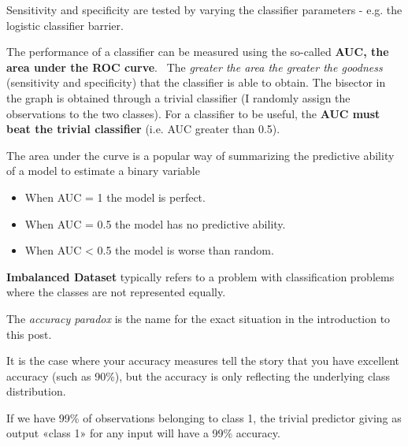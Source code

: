 Sensitivity and specificity are tested by varying the classifier parameters - e.g. the logistic classifier barrier.


The performance of a classifier can be measured using the so-called \textbf{AUC, the area under the ROC curve}. \ The \textit{greater the area the greater the goodness} (sensitivity and specificity) that the classifier is able to obtain. The bisector in the graph is obtained through a trivial classifier (I randomly assign the observations to the two classes). For a classifier to be useful, the \textbf{AUC must beat the trivial classifier} (i.e. AUC greater than 0.5).

The area under the curve is a popular way of summarizing the predictive ability of a model to estimate a binary variable
\begin{itemize}
    \item When AUC = 1 the model is perfect. 
    \item When AUC = 0.5 the model has no predictive ability.
    \item When AUC < 0.5 the model is worse than random.
\end{itemize}

\textbf{Imbalanced Dataset} typically refers to a problem with classification problems where the classes are not represented equally.

The \textit{accuracy paradox} is the name for the exact situation in the introduction to this post.

It is the case where your accuracy measures tell the story that you have excellent accuracy (such as 90\%), but the accuracy is only reflecting the underlying class distribution.

If we have 99\% of observations belonging to class 1, the trivial predictor giving as output «class 1» for any input will have a 99\% accuracy.

